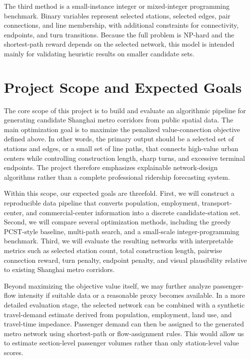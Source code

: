 \documentclass[9pt,a4paper,twocolumn,twoside]{tau-class/tau}
\begin{document}
    The third method is a small-instance integer or mixed-integer programming benchmark. Binary variables represent selected stations, selected edges, pair connections, and line membership, with additional constraints for connectivity, endpoints, and turn transitions. Because the full problem is NP-hard and the shortest-path reward depends on the selected network, this model is intended mainly for validating heuristic results on smaller candidate sets.

\section{Project Scope and Expected Goals}

    The core scope of this project is to build and evaluate an algorithmic pipeline for generating candidate Shanghai metro corridors from public spatial data. The main optimization goal is to maximize the penalized value-connection objective defined above. In other words, the primary output should be a selected set of stations and edges, or a small set of line paths, that connects high-value urban centers while controlling construction length, sharp turns, and excessive terminal endpoints. The project therefore emphasizes explainable network-design algorithms rather than a complete professional ridership forecasting system.

    Within this scope, our expected goals are threefold. First, we will construct a reproducible data pipeline that converts population, employment, transport-center, and commercial-center information into a discrete candidate-station set. Second, we will compare several optimization methods, including the greedy PCST-style baseline, multi-path search, and a small-scale integer-programming benchmark. Third, we will evaluate the resulting networks with interpretable metrics such as selected station count, total construction length, pairwise connection reward, turn penalty, endpoint penalty, and visual plausibility relative to existing Shanghai metro corridors.

    Beyond maximizing the objective value itself, we may further analyze passenger-flow intensity if suitable data or a reasonable proxy becomes available. In a more detailed evaluation stage, the selected network can be combined with a synthetic travel-demand estimate derived from population, employment, land use, and travel-time impedance. Passenger demand can then be assigned to the generated metro network using shortest-path or flow-assignment rules. This would allow us to estimate section-level passenger volumes rather than only station-level value scores.
\end{document}
